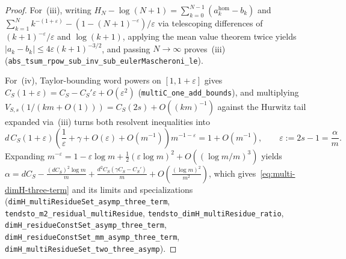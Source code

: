 \begin{proof}
For~(iii), writing $H_N-\log(N+1)=\sum_{k=0}^{N-1}(a_k^{\mathrm{hom}}-b_k)$
and $\sum_{k=1}^N k^{-(1+\varepsilon)}-(1-(N+1)^{-\varepsilon})/\varepsilon$
via telescoping differences of $(k+1)^{-\varepsilon}/\varepsilon$ and
$\log(k+1)$, applying the mean value theorem twice yields $|a_k-b_k|\le 4\varepsilon(k+1)^{-3/2}$,
and passing $N\to\infty$ proves~\textup{(iii)}
(\texttt{abs\_\allowbreak tsum\_\allowbreak rpow\_\allowbreak sub\_\allowbreak inv\_\allowbreak sub\_\allowbreak eulerMascheroni\_\allowbreak le}).

For~(iv), Taylor-bounding word powers on $[1,1+\varepsilon]$ gives
$C_S(1+\varepsilon)=C_S-C_S'\varepsilon+O(\varepsilon^2)$
(\texttt{multiC\_\allowbreak one\_\allowbreak add\_\allowbreak bounds}), and
multiplying $V_{S,s}(1/(km+O(1)))=C_S(2s)+O((km)^{-1})$ against the Hurwitz
tail expanded via~\textup{(iii)} turns both resolvent inequalities into
\[
d\,C_S(1+\varepsilon)\left(\frac{1}{\varepsilon}+\gamma+O(\varepsilon)+O(m^{-1})\right)m^{-1-\varepsilon}=1+O(m^{-1}),\qquad \varepsilon:=2s-1=\frac{\alpha}{m}.
\]
Expanding $m^{-\varepsilon}=1-\varepsilon\log m+\frac12(\varepsilon\log m)^2+O((\log m/m)^3)$
yields $\alpha=dC_S-\frac{(dC_S)^2\log m}{m}+\frac{d^2C_S(\gamma C_S-C_S')}{m}+O\!\left(\frac{(\log m)^2}{m^2}\right)$,
which gives~\eqref{eq:multi-dimH-three-term} and its limits and specializations
(\texttt{dimH\_\allowbreak multiResidueSet\_\allowbreak asymp\_\allowbreak three\_\allowbreak term},
\texttt{tendsto\_\allowbreak m2\_\allowbreak residual\_\allowbreak multiResidue},
\texttt{tendsto\_\allowbreak dimH\_\allowbreak multiResidue\_\allowbreak ratio},
\texttt{dimH\_\allowbreak residueConstSet\_\allowbreak asymp\_\allowbreak three\_\allowbreak term},
\texttt{dimH\_\allowbreak residueConstSet\_\allowbreak mm\_\allowbreak asymp\_\allowbreak three\_\allowbreak term},
\texttt{dimH\_\allowbreak multiResidueSet\_\allowbreak two\_\allowbreak three\_\allowbreak asymp}).


\end{proof}
